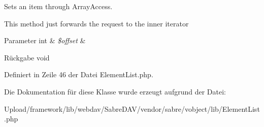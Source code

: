 Sets an item through Array\+Access.

This method just forwards the request to the inner iterator


\begin{DoxyParams}[1]{Parameter}
int & {\em \$offset} & \\
\hline
\end{DoxyParams}
\begin{DoxyReturn}{Rückgabe}
void 
\end{DoxyReturn}


Definiert in Zeile 46 der Datei Element\+List.\+php.



Die Dokumentation für diese Klasse wurde erzeugt aufgrund der Datei\+:\begin{DoxyCompactItemize}
\item 
Upload/framework/lib/webdav/\+Sabre\+D\+A\+V/vendor/sabre/vobject/lib/Element\+List.\+php\end{DoxyCompactItemize}
